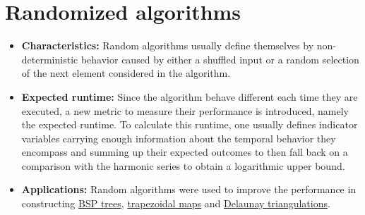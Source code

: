 \section{Randomized algorithms}
    \begin{itemize}
        \item \textbf{Characteristics:} Random algorithms usually define themselves by non-deterministic behavior caused by either a shuffled input or a random selection of the next element considered in the algorithm.

        \item \textbf{Expected runtime:} Since the algorithm behave different each time they are executed, a new metric to measure their performance is introduced, namely the expected runtime. To calculate this runtime, one usually defines indicator variables carrying enough information about the temporal behavior they encompass and summing up their expected outcomes to then fall back on a comparison with the harmonic series to obtain a logarithmic upper bound.

        \item \textbf{Applications:} Random algorithms were used to improve the performance in constructing \hyperref[ch:bsptrees]{BSP trees}, \hyperref[ch:point_location]{trapezoidal maps} and \hyperref[ch:delaunay_triangulation]{Delaunay triangulations}.
    \end{itemize}